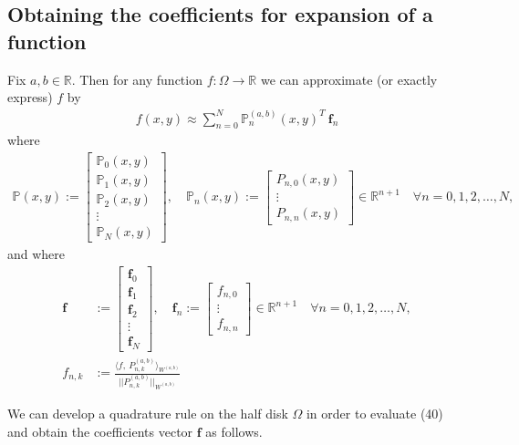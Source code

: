 \documentclass[11pt, oneside]{article}   	%
\newcommand{\R}{\mathbb{R}}
\newcommand{\bigP}{\mathbb{P}}
\newcommand{\Pnk}{P_{n,k}}
\begin{document}
\subsection{Obtaining the coefficients for expansion of a function}

Fix \(a,b \in \R\). Then for any function \(f : \Omega \to \R\) we can approximate (or exactly express) \(f\) by
\begin{align}
f(x,y) \approx \sum_{n=0}^N \bigP_n^{(a,b)}(x,y)^T \: \mathbf{f}_n
\end{align}
where
\begin{align}
\bigP(x,y) := \begin{bmatrix}
		\bigP_0(x,y) \\
		\hline
		\bigP_1(x,y) \\
		\hline
		\bigP_2(x,y) \\
		\hline
		\vdots \\
		\hline
		\bigP_N(x,y)
	\end{bmatrix},
\quad
\bigP_n(x,y) := \begin{bmatrix}
		P_{n,0}(x,y) \\
		\vdots \\
		P_{n,n}(x,y)
	\end{bmatrix} \in \R^{n+1} \quad \forall n = 0,1,2,\dots,N,
\end{align}
and where
\begin{align}
\mathbf{f} &:= \begin{bmatrix}
		\mathbf{f}_0 \\
		\hline
		\mathbf{f}_1 \\
		\hline
		\mathbf{f}_2\\
		\hline
		\vdots \\
		\hline
		\mathbf{f}_N
	\end{bmatrix},
\quad
\mathbf{f}_n := \begin{bmatrix}
		f_{n,0} \\
		\vdots \\
		f_{n,n}
	\end{bmatrix} \in \R^{n+1} \quad \forall n = 0,1,2,\dots,N, \\
f_{n,k} &:= \frac{\langle f, \: \Pnk^{(a,b)} \rangle_{W^{(a,b)}}}{|| \Pnk^{(a,b)} ||_{W^{(a,b)}}}
\end{align}




We can develop a quadrature rule on the half disk \(\Omega\) in order to evaluate (40) and obtain the coefficients vector \(\mathbf{f}\) as follows.
\end{document}
